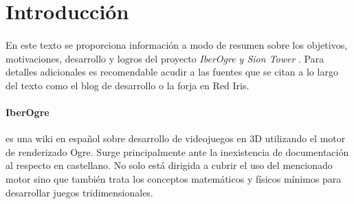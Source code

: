 \documentclass[16pt,spanish]{article}
\title{\titlename}
\author{\authorname}
\def \plpath{.}
\def \proyecto{\emph {IberOgre y Sion Tower} }
\begin{document}




\tableofcontents
\cleardoublepage







\section{Introducción}

\paragraph{}
En este texto se proporciona información a modo de resumen sobre los
objetivos, motivaciones, desarrollo y logros del proyecto \proyecto.
Para detalles adicionales es recomendable acudir a las fuentes que se
citan a lo largo del texto como el blog de desarrollo o la forja en Red Iris.

\paragraph{IberOgre}
es una wiki en español sobre desarrollo de videojuegos en 3D
utilizando el motor de renderizado Ogre. Surge principalmente ante la
inexistencia de documentación al respecto en castellano. No solo está
dirigida a cubrir el uso del mencionado motor sino que también trata
los conceptos matemáticos y físicos mínimos para desarrollar juegos
tridimensionales.
\end{document}
